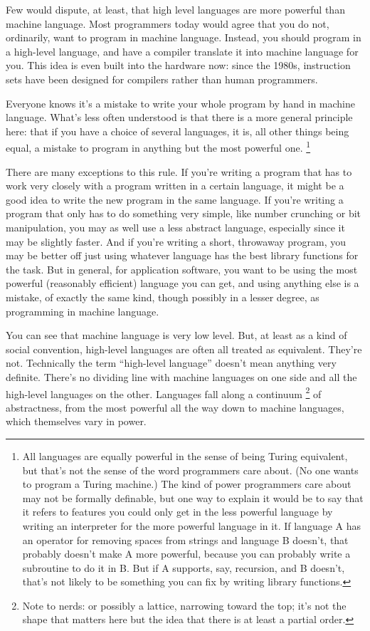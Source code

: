 \documentclass[12pt]{book}
\begin{document}
Few would dispute, at least, that high level languages are more powerful
than machine language. Most programmers today would agree that you do
not, ordinarily, want to program in machine language. Instead, you
should program in a high-level language, and have a compiler translate
it into machine language for you. This idea is even built into the
hardware now: since the 1980s, instruction sets have been designed for
compilers rather than human programmers.

Everyone knows it's a mistake to write your whole program by hand in
machine language. What's less often understood is that there is a more
general principle here: that if you have a choice of several languages,
it is, all other things being equal, a mistake to program in anything
but the most powerful one. \footnote{All languages are equally powerful in the sense of being Turing
equivalent, but that's not the sense of the word programmers care about.
(No one wants to program a Turing machine.) The kind of power
programmers care about may not be formally definable, but one way to
explain it would be to say that it refers to features you could only get
in the less powerful language by writing an interpreter for the more
powerful language in it. If language A has an operator for removing
spaces from strings and language B doesn't, that probably doesn't make A
more powerful, because you can probably write a subroutine to do it in
B. But if A supports, say, recursion, and B doesn't, that's not likely
to be something you can fix by writing library functions.}

There are many exceptions to this rule. If you're writing a program that
has to work very closely with a program written in a certain language,
it might be a good idea to write the new program in the same language.
If you're writing a program that only has to do something very simple,
like number crunching or bit manipulation, you may as well use a less
abstract language, especially since it may be slightly faster. And if
you're writing a short, throwaway program, you may be better off just
using whatever language has the best library functions for the task. But
in general, for application software, you want to be using the most
powerful (reasonably efficient) language you can get, and using anything
else is a mistake, of exactly the same kind, though possibly in a lesser
degree, as programming in machine language.

You can see that machine language is very low level. But, at least as a
kind of social convention, high-level languages are often all treated as
equivalent. They're not. Technically the term ``high-level language''
doesn't mean anything very definite. There's no dividing line with
machine languages on one side and all the high-level languages on the
other. Languages fall along a continuum \footnote{Note to nerds: or possibly a lattice, narrowing toward the top;
it's not the shape that matters here but the idea that there is at least
a partial order.} of abstractness, from
the most powerful all the way down to machine languages, which
themselves vary in power.
\end{document}
